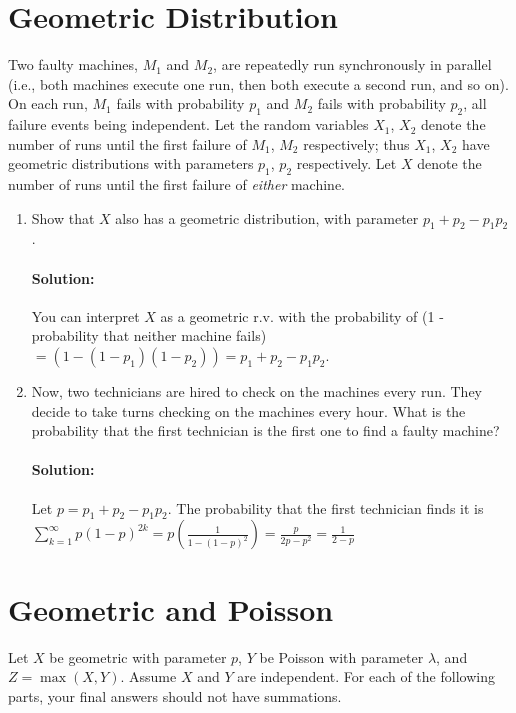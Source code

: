 \documentclass[11pt, notitlepage]{article}
\newcommand{\Question}[1]{\newpage\section{#1}}
\newenvironment{solution}{\paragraph{Solution:}}{\hfill \vspace{10mm}}
\begin{document}
\Question{Geometric Distribution}

Two faulty machines, $M_1$ and $M_2$, are repeatedly run synchronously in parallel (i.e., both machines execute one run, then both execute a second run, and so on). On each run, $M_1$ fails with probability $p_1$ and $M_2$ fails with probability $p_2$, all failure events being independent. Let the random variables $X_1$, $X_2$ denote the number of runs until the first failure of $M_1$, $M_2$ respectively; thus $X_1$, $X_2$ have geometric distributions with parameters $p_1$, $p_2$ respectively. Let $X$ denote the number of runs until the first failure of \emph{either} machine.

\begin{enumerate}[label=\alph*.)]
\item Show that $X$ also has a geometric distribution, with parameter $p_1+p_2-p_1p_2$.
\begin{solution}
	You can interpret $X$ as a geometric r.v. with the probability of (1 - probability that neither machine fails) $= (1-(1-p_1)(1-p_2))=p_1+p_2-p_1p_2$.
\end{solution}
\item Now, two technicians are hired to check on the machines every run. They decide to take turns checking on the machines every hour. What is the probability that the first technician is the first one to find a faulty machine?
\begin{solution}
	Let $p=p_1+p_2-p_1p_2$. The probability that the first technician finds it is $\sum_{k=1}^{\infty}{p(1-p)^{2k}}=p (\frac{1}{1-(1-p)^2})=\frac{p}{2p-p^2}=\frac{1}{2-p}$
\end{solution}
\end{enumerate}


\Question{Geometric and Poisson}
Let $X$ be geometric with parameter $p$, $Y$ be Poisson with parameter $\lambda$, and $Z=\max(X,Y)$. Assume $X$ and $Y$ are independent. For each of the following parts, your final answers should not have summations.
\end{document}
